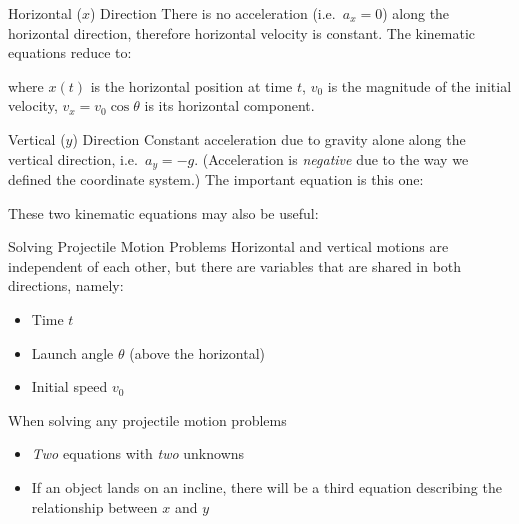 \documentclass[12pt,compress,aspectratio=169]{beamer}
\newcommand{\eq}[2]{\vspace{#1}{\Large\begin{displaymath}#2\end{displaymath}}}
\begin{document}
\begin{frame}{Horizontal ($x$) Direction}
  There is no acceleration (i.e.\ $a_x=\num{0}$) along the horizontal direction,
  therefore horizontal velocity is constant. The kinematic equations reduce to:

  \eq{-.2in}{
    x(t)=v_xt=\left[v_0\cos\theta\right] t
  }

  where $x(t)$ is the horizontal position at time $t$, $v_0$ is the
  magnitude of the initial velocity, $v_x=v_0\cos\theta$ is its horizontal
  component.
\end{frame}




\begin{frame}{Vertical ($y$) Direction}
  Constant acceleration due to gravity alone along the vertical direction, i.e.\
  $a_y=-g$. (Acceleration is \emph{negative} due to the way we defined the
  coordinate system.) The important equation is this one:

  \eq{-.2in}{
    y(t) = \left[v_0\sin\theta\right]t-\frac12gt^2
  }

  These two kinematic equations may also be useful:

  \vspace{-.2in}{\Large
    \begin{align*}
      v_y &= \left[v_0\sin\theta\right] -gt\\
      v_y^2&=\left[v_0\sin\theta\right]^2-2gy
    \end{align*}
  }
\end{frame}



\begin{frame}{Solving Projectile Motion Problems}
  Horizontal and vertical motions are independent of each other, but there are
  variables that are shared in both directions, namely:
  \begin{itemize}
  \item Time $t$
  \item Launch angle $\theta$ (above the horizontal)
  \item Initial speed $v_0$
  \end{itemize}
  
  \vspace{.2in}When solving any projectile motion problems
  \begin{itemize}
  \item \emph{Two} equations with \emph{two} unknowns
  \item If an object lands on an incline, there will be a third equation
    describing the relationship between $x$ and $y$
  \end{itemize}
\end{frame}
\end{document}
